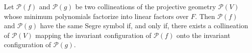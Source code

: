 Let $\mathcal{P}(f)$ and $\mathcal{P}(g)$ be two collineations of the projective geometry $\mathcal{P}(V)$ whose minimum polynomials factorize into linear factors over $F$. Then $\mathcal{P}(f)$ and $\mathcal{P}(g)$ have the same Segre symbol if, and only if, there exists a collineation of $\mathcal{P}(V)$ mapping the invariant configuration of $\mathcal{P}(f)$ onto the invariant configuration of $\mathcal{P}(g)$.
